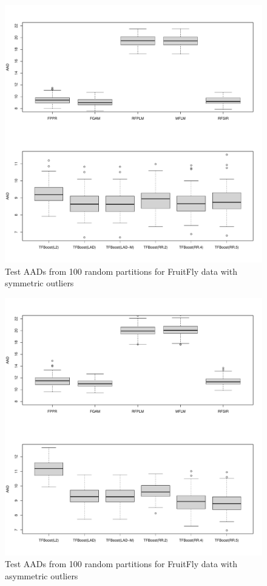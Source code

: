 \documentclass{article}
\begin{document}
\begin{figure}
	\includegraphics[scale = 0.5]{figs/Frui_Fly_B.pdf}
	\caption{Test AADs from 100 random partitions for FruitFly data with symmetric outliers}
\end{figure}


\begin{figure}
	\includegraphics[scale = 0.5]{figs/Frui_Fly_A.pdf}
	\caption{Test AADs from 100 random partitions for FruitFly data with asymmetric outliers}
\end{figure}
\end{document}
